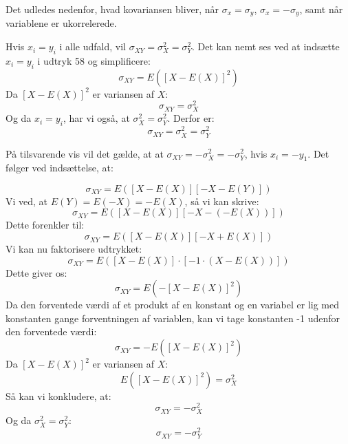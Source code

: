 \documentclass[10pt,reqno, usenames]{article}
\begin{document}
Det udledes nedenfor, hvad kovariansen bliver, når $\sigma_x = \sigma_y$,  $\sigma_x = -\sigma_y$, samt når variablene er ukorrelerede.
\begin{tcolorbox}[breakable, colback=red!5!white, colframe=red!50!black, title= Udledning af sammenhænge indenfor kovarians]

Hvis $x_i = y_i$ i alle udfald, vil $\sigma_{XY} = \sigma_X^2 = \sigma_Y^2$. Det kan nemt ses ved at indsætte $x_i = y_i$ i udtryk 58 og simplificere: 
\begin{equation*}
\sigma_{XY} = E\left( [X - E(X)]^2 \right)
\end{equation*}
Da $[X - E(X)]^2$ er variansen af $X$:
\begin{equation*}
\sigma_{XY} = \sigma_X^2
\end{equation*}
Og da $x_i = y_i$, har vi også, at $\sigma_X^2 = \sigma_Y^2$. Derfor er:
\begin{equation*}
\sigma_{XY} = \sigma_X^2 = \sigma_Y^2
\end{equation*}

På tilsvarende vis vil det gælde, at  at $\sigma_{XY} = -\sigma_X^2 = -\sigma_Y^2$, hvis $x_i = -y_1$. Det følger ved indsættelse, at: 

\begin{equation*}
\sigma_{XY} = E\left( [X - E(X)][-X - E(Y)] \right)
\end{equation*}
Vi ved, at $E(Y) = E(-X) = -E(X)$, så vi kan skrive:
\begin{equation*}
\sigma_{XY} = E\left( [X - E(X)][-X - (-E(X))] \right)
\end{equation*}
Dette forenkler til:
\begin{equation*}
\sigma_{XY} = E\left( [X - E(X)][-X + E(X)] \right)
\end{equation*}
Vi kan nu faktorisere udtrykket:
\begin{equation*}
\sigma_{XY} = E\left( [X - E(X)] \cdot [-1 \cdot (X - E(X))] \right)
\end{equation*}
Dette giver os:
\begin{equation*}
\sigma_{XY} = E\left( -[X - E(X)]^2 \right)
\end{equation*}
Da den forventede værdi af et produkt af en konstant og en variabel er lig med konstanten gange forventningen af variablen, kan vi tage konstanten -1 udenfor den forventede værdi:
\begin{equation*}
\sigma_{XY} = -E\left( [X - E(X)]^2 \right)
\end{equation*}
Da $[X - E(X)]^2$ er variansen af $X$:
\begin{equation*}
E\left( [X - E(X)]^2 \right) = \sigma_X^2
\end{equation*}
Så kan vi konkludere, at:
\begin{equation*}
\sigma_{XY} = -\sigma_X^2
\end{equation*}
Og da $\sigma_X^2 = \sigma_Y^2$:
\begin{equation*}
\sigma_{XY} = -\sigma_Y^2
\end{equation*}


\end{tcolorbox}
\end{document}
